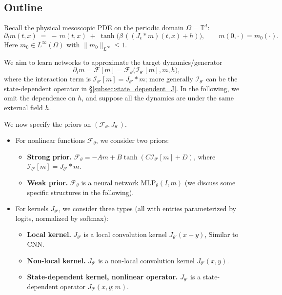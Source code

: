 \documentclass[11pt,a4paper]{article}
\theoremstyle{plain}
\theoremstyle{definition}
\theoremstyle{remark}
\begin{document}
\subsection{Outline}


Recall the physical mesoscopic PDE on the periodic domain $\Omega=\mathbb{T}^d$:
\[
	\partial_t m(t,x) \;=\; -\,m(t,x)\; +\; \tanh\!\big(\beta\,((J_\epsilon * m)(t,x) + h)\big),
	\qquad m(0,\cdot)=m_0(\cdot).
\]
Here $m_0\in L^\infty(\Omega)$ with $\|m_0\|_{L^\infty}\le 1$.



We aim to learn networks to approximate the target dynamics/generator
$$
	\partial_t m = \mathcal{F}[m] = \mathcal{F}_\theta\big(\mathcal{I}_{\theta\prime}[m], m, h \big),
$$
where the interaction term is $\mathcal{I}_{\theta\prime}[m]=J_{\theta\prime}*m$; more generally $\mathcal{I}_{\theta\prime}$ can be the state-dependent operator in \S\ref{subsec:state_dependent_J}. In the following, we omit the dependence on $h$, and suppose all the dynamics are under the same external field $h$.

We now specify the priors on $(\mathcal{F}_\theta,J_{\theta\prime})$.
\begin{itemize}
	\item For nonlinear functions $\mathcal{F}_\theta$, we consider two priors:
	      \begin{itemize}
		      \item \textbf{Strong prior.} $\mathcal{F}_\theta = -A m + B \tanh(C \mathcal{I}_{\theta\prime}[m] + D)$, where $\mathcal{I}_{\theta\prime}[m]=J_{\theta\prime}*m$.
		      \item \textbf{Weak prior.} $\mathcal{F}_\theta$ is a neural network $\mathrm{MLP}_\theta(I,m)$ (we discuss some specific structures in the following). %
	      \end{itemize}
	\item For kernels $J_{\theta\prime}$, we consider three types (all with entries parameterized by logits, normalized by softmax):
	      \begin{itemize}
		      \item \textbf{Local kernel.} $J_{\theta\prime}$ is a local convolution kernel $J_{\theta\prime}(x-y)$, Similar to CNN.
		      \item \textbf{Non-local kernel.} $J_{\theta\prime}$ is a non-local convolution kernel $J_{\theta\prime}(x,y)$.
		      \item \textbf{State-dependent kernel, nonlinear operator.} $J_{\theta\prime}$ is a state-dependent operator $J_{\theta\prime}(x,y; m)$. %
	      \end{itemize}

\end{itemize}
\end{document}
